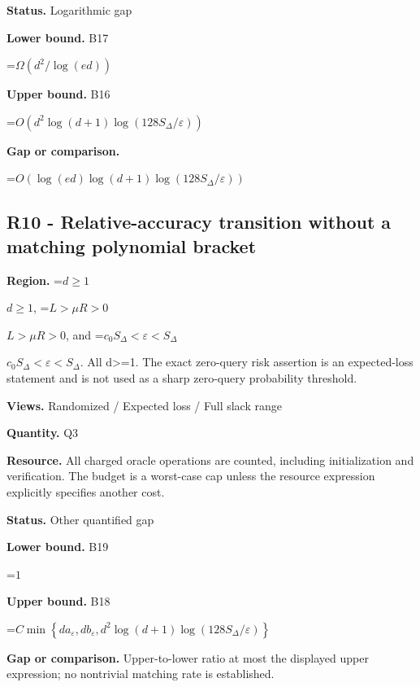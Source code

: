 \documentclass[10pt,a4paper]{article}
\newcommand{\AtlasMath}[1]{\par\begingroup\centering\setbox0=\hbox{$\displaystyle #1$}\ifdim\wd0>1.4\linewidth\typeout{ATLAS WIDE FORMULA: \the\wd0}\fi\ifdim\wd0>\linewidth\resizebox{\linewidth}{!}{\box0}\else\box0\fi\par\endgroup}
\newcommand{\AtlasInlineMath}[1]{\begingroup\setbox0=\hbox{$#1$}\ifdim\wd0>.4\linewidth\endgroup\AtlasMath{#1}\else\endgroup$#1$\fi}
\begin{document}
\textbf{Status.} Logarithmic gap



\textbf{Lower bound.} B17



\AtlasMath{\Omega(d^2/\log(ed))}


\textbf{Upper bound.} B16



\AtlasMath{O\!\left(d^2\log(d+1)\log(128S_\Delta/\varepsilon)\right)}


\textbf{Gap or comparison.}



\AtlasMath{O\!\left(\log(ed)\log(d+1)\log(128S_\Delta/\varepsilon)\right)}


\subsection{R10 - Relative-accuracy transition without a matching polynomial bracket}


\textbf{Region.} \AtlasInlineMath{d\ge1}, \AtlasInlineMath{L>\mu R>0}, and \AtlasInlineMath{c_0S_\Delta<\varepsilon<S_\Delta}. All d>=1. The exact zero-query risk assertion is an expected-loss statement and is not used as a sharp zero-query probability threshold.



\textbf{Views.} Randomized / Expected loss / Full slack range



\textbf{Quantity.} Q3



\textbf{Resource.} All charged oracle operations are counted, including initialization and verification. The budget is a worst-case cap unless the resource expression explicitly specifies another cost.



\textbf{Status.} Other quantified gap



\textbf{Lower bound.} B19



\AtlasMath{1}


\textbf{Upper bound.} B18



\AtlasMath{C\min\left\{da_\varepsilon,db_\varepsilon,d^2\log(d+1)\log(128S_\Delta/\varepsilon)\right\}}


\textbf{Gap or comparison.} Upper-to-lower ratio at most the displayed upper expression; no nontrivial matching rate is established.
\end{document}
